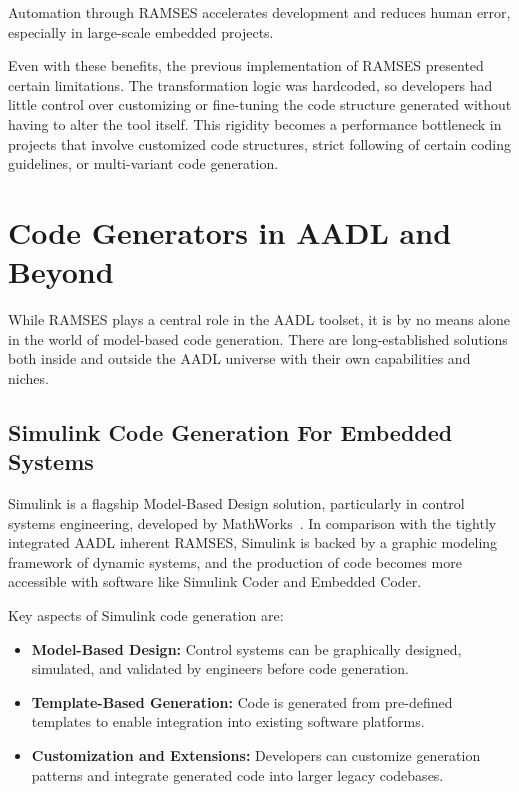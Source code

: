 \begin{tcolorbox}[colback=green!5, colframe=green!40!black] 
	Automation through \gls{RAMSES} accelerates development and reduces human error, especially in large-scale embedded projects. 
\end{tcolorbox}

Even with these benefits, the previous implementation of \gls{RAMSES} presented certain limitations. The transformation logic was hardcoded, so developers had little control over customizing or fine-tuning the code structure generated without having to alter the tool itself. This rigidity becomes a performance bottleneck in projects that involve customized code structures, strict following of certain coding guidelines, or multi-variant code generation.


\section{Code Generators in AADL and Beyond} 
\label{sub:code_generators}

While \gls{RAMSES} plays a central role in the \gls{AADL} toolset, it is by no means alone in the world of model-based code generation. There are long-established solutions both inside and outside the \gls{AADL} universe with their own capabilities and niches.


\subsection{Simulink Code Generation For Embedded Systems}
\label{sec:simulink}

Simulink is a flagship Model-Based Design solution, particularly in control systems engineering, developed by MathWorks~\cite{simulink_documentation}. In comparison with the tightly integrated \gls{AADL} inherent \gls{RAMSES}, Simulink is backed by a graphic modeling framework of dynamic systems, and the production of code becomes more accessible with software like Simulink Coder and Embedded Coder.

Key aspects of Simulink code generation are:
 \begin{itemize} 
 	\item \textbf{Model-Based Design:} Control systems can be graphically designed, simulated, and validated by engineers before code generation. 
 	\item \textbf{Template-Based Generation:} Code is generated from pre-defined templates to enable integration into existing software platforms. 
 	\item \textbf{Customization and Extensions:} Developers can customize generation patterns and integrate generated code into larger legacy codebases. 
 \end{itemize}

